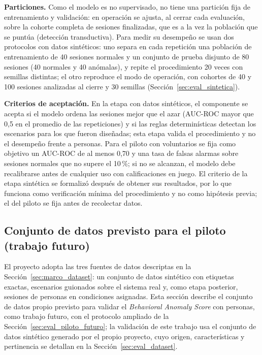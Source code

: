 \textbf{Particiones.} Como el modelo es no supervisado, no tiene una partición fija de entrenamiento y validación: en operación se ajusta, al cerrar cada evaluación, sobre la cohorte completa de sesiones finalizadas, que es a la vez la población que se puntúa (detección transductiva). Para medir su desempeño se usan dos protocolos con datos sintéticos: uno separa en cada repetición una población de entrenamiento de 40 sesiones normales y un conjunto de prueba disjunto de 80 sesiones (40 normales y 40 anómalas), y repite el procedimiento 20 veces con semillas distintas; el otro reproduce el modo de operación, con cohortes de 40 y 100 sesiones analizadas al cierre y 30 semillas (Sección~\ref{sec:eval_sintetica}).

\textbf{Criterios de aceptación.} En la etapa con datos sintéticos, el componente se acepta si el modelo ordena las sesiones mejor que el azar (AUC-ROC mayor que 0{,}5 en el promedio de las repeticiones) y si las reglas determinísticas detectan los escenarios para los que fueron diseñadas; esta etapa valida el procedimiento y no el desempeño frente a personas. Para el piloto con voluntarios se fija como objetivo un AUC-ROC de al menos 0{,}70 y una tasa de falsas alarmas sobre sesiones normales que no supere el 10\,\%; si no se alcanzan, el modelo debe recalibrarse antes de cualquier uso con calificaciones en juego. El criterio de la etapa sintética se formalizó después de obtener sus resultados, por lo que funciona como verificación mínima del procedimiento y no como hipótesis previa; el del piloto se fija antes de recolectar datos.

\subsection{Conjunto de datos previsto para el piloto (trabajo futuro)}
\label{sec:dataset_piloto}

El proyecto adopta las tres fuentes de datos descriptas en la Sección~\ref{sec:marco_dataset}: un conjunto de datos sintético con etiquetas exactas, escenarios guionados sobre el sistema real y, como etapa posterior, sesiones de personas en condiciones asignadas. Esta sección describe el conjunto de datos propio previsto para validar el \textit{Behavioral Anomaly Score} con personas, como trabajo futuro, con el protocolo ampliado de la Sección~\ref{sec:eval_piloto_futuro}; la validación de este trabajo usa el conjunto de datos sintético generado por el propio proyecto, cuyo origen, características y pertinencia se detallan en la Sección~\ref{sec:eval_dataset}.

